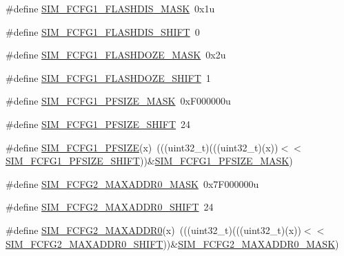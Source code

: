 \begin{DoxyCompactItemize}
\item 
\#define \hyperlink{group___s_i_m___register___masks_gad2bcfe2db5329ab186bb8393228f24cc}{S\+I\+M\+\_\+\+F\+C\+F\+G1\+\_\+\+F\+L\+A\+S\+H\+D\+I\+S\+\_\+\+M\+A\+SK}~0x1u
\item 
\#define \hyperlink{group___s_i_m___register___masks_ga1a8408a876a3a68b16780a1d45d539df}{S\+I\+M\+\_\+\+F\+C\+F\+G1\+\_\+\+F\+L\+A\+S\+H\+D\+I\+S\+\_\+\+S\+H\+I\+FT}~0
\item 
\#define \hyperlink{group___s_i_m___register___masks_ga5922dc31ee4c05aba3cfeaa4474fddb8}{S\+I\+M\+\_\+\+F\+C\+F\+G1\+\_\+\+F\+L\+A\+S\+H\+D\+O\+Z\+E\+\_\+\+M\+A\+SK}~0x2u
\item 
\#define \hyperlink{group___s_i_m___register___masks_ga3f6c60d4baf2c592dbd5c43974bd19f3}{S\+I\+M\+\_\+\+F\+C\+F\+G1\+\_\+\+F\+L\+A\+S\+H\+D\+O\+Z\+E\+\_\+\+S\+H\+I\+FT}~1
\item 
\#define \hyperlink{group___s_i_m___register___masks_ga5adf627ba4cd9516ebf3e0a6d33aa7c5}{S\+I\+M\+\_\+\+F\+C\+F\+G1\+\_\+\+P\+F\+S\+I\+Z\+E\+\_\+\+M\+A\+SK}~0x\+F000000u
\item 
\#define \hyperlink{group___s_i_m___register___masks_gaec8960bc114f5539e22701491dcf58f7}{S\+I\+M\+\_\+\+F\+C\+F\+G1\+\_\+\+P\+F\+S\+I\+Z\+E\+\_\+\+S\+H\+I\+FT}~24
\item 
\#define \hyperlink{group___s_i_m___register___masks_ga7527f7f4bdcd4c0b2baf6c99a5b6735a}{S\+I\+M\+\_\+\+F\+C\+F\+G1\+\_\+\+P\+F\+S\+I\+ZE}(x)~(((uint32\+\_\+t)(((uint32\+\_\+t)(x))$<$$<$\hyperlink{group___s_i_m___register___masks_gaec8960bc114f5539e22701491dcf58f7}{S\+I\+M\+\_\+\+F\+C\+F\+G1\+\_\+\+P\+F\+S\+I\+Z\+E\+\_\+\+S\+H\+I\+FT}))\&\hyperlink{group___s_i_m___register___masks_ga5adf627ba4cd9516ebf3e0a6d33aa7c5}{S\+I\+M\+\_\+\+F\+C\+F\+G1\+\_\+\+P\+F\+S\+I\+Z\+E\+\_\+\+M\+A\+SK})
\item 
\#define \hyperlink{group___s_i_m___register___masks_gad1096c0a75d0bf4dfc93f4b1957fe493}{S\+I\+M\+\_\+\+F\+C\+F\+G2\+\_\+\+M\+A\+X\+A\+D\+D\+R0\+\_\+\+M\+A\+SK}~0x7\+F000000u
\item 
\#define \hyperlink{group___s_i_m___register___masks_ga3ccb8fde0ef2e170d0c84cdfa3651d34}{S\+I\+M\+\_\+\+F\+C\+F\+G2\+\_\+\+M\+A\+X\+A\+D\+D\+R0\+\_\+\+S\+H\+I\+FT}~24
\item 
\#define \hyperlink{group___s_i_m___register___masks_gae7829e3338a5d460d360b8ed9e06e1e1}{S\+I\+M\+\_\+\+F\+C\+F\+G2\+\_\+\+M\+A\+X\+A\+D\+D\+R0}(x)~(((uint32\+\_\+t)(((uint32\+\_\+t)(x))$<$$<$\hyperlink{group___s_i_m___register___masks_ga3ccb8fde0ef2e170d0c84cdfa3651d34}{S\+I\+M\+\_\+\+F\+C\+F\+G2\+\_\+\+M\+A\+X\+A\+D\+D\+R0\+\_\+\+S\+H\+I\+FT}))\&\hyperlink{group___s_i_m___register___masks_gad1096c0a75d0bf4dfc93f4b1957fe493}{S\+I\+M\+\_\+\+F\+C\+F\+G2\+\_\+\+M\+A\+X\+A\+D\+D\+R0\+\_\+\+M\+A\+SK})

\end{DoxyCompactItemize}
